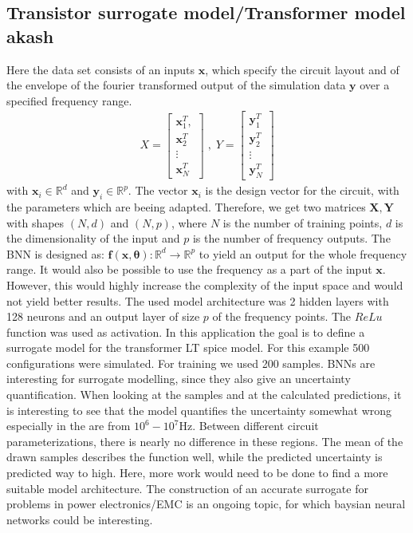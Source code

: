 \documentclass{article}
\begin{document}
\subsection{Transistor surrogate model/Transformer model akash}
Here the data set consists of an inputs $ \bm x$, which specify the circuit layout and of the envelope of the fourier transformed output of the simulation data $\bm y$ over a specified frequency range.
\begin{align}
    X = \begin{bmatrix}
        \bm x_1^T, \\
        \bm x_2^T\\
        \vdots\\
        \bm x_N^T
        \end{bmatrix} \;, \;
    Y = \begin{bmatrix}
        \bm y_1^T\\
        \bm y_2^T\\
        \vdots\\
        \bm y_N^T
    \end{bmatrix}
\end{align}
with $\bm x_i \in \mathbb{R}^d$ and $\bm y_i \in \mathbb{R}^{p}$. The vector $\bm x_i$ is the design vector for the circuit, with the parameters which are beeing adapted.
Therefore, we get two matrices $\bm X, \bm Y$ with shapes $(N, d)$ and $(N, p)$, where $N$ is the number of training points, $d$ is the dimensionality of the input and $p$ is the number of frequency outputs. The BNN is designed as: $\bm f(\bm x, \bm \theta): \mathbb{R}^d \rightarrow \mathbb{R}^p$ to yield an output for the whole frequency range. It would also be possible to use the frequency as a part of the input $\bm x$. However, this would highly increase the complexity of the input space and would not yield better results. The used model architecture was 2 hidden layers with 128 neurons and an output layer of size $p$ of the frequency points. The $ReLu$ function was used as activation. In this application the goal is to define a surrogate model for the transformer LT spice model. For this example 500 configurations were simulated. For training we used 200 samples. BNNs are interesting for surrogate modelling, since they also give an uncertainty quantification. When looking at the samples and at the calculated predictions, it is interesting to see that the model quantifies the uncertainty somewhat wrong especially in the are from $10^6 - 10^7 $Hz. Between different circuit parameterizations, there is nearly no difference in these regions. The mean of the drawn samples describes the function well, while the predicted uncertainty is predicted way to high. Here, more work would need to be done to find a more suitable model architecture. The construction of an accurate surrogate for problems in power electronics/EMC is an ongoing topic, for which baysian neural networks could be interesting.
\end{document}
